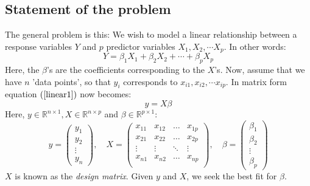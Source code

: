 \documentclass[12pt, a4paper]{article}
\begin{document}
\subsection{Statement of the problem}
The general problem is this: We wish to model a linear relationship between a response variables $Y$ and $p$ predictor variables $X_1, X_2,\cdots X_p$. In other words:
\begin{equation}
\label{linear1}
Y=\beta_1 X_1 + \beta_2 X_2 + \cdots + \beta_p X_p
\end{equation}
Here, the $\beta$'s are the coefficients corresponding to the $X$'s. Now, assume that we have $n$ 'data points', so that $y_i$ corresponds to $x_{i1}, x_{i2},\cdots x_{ip}$. In matrix form equation $(\ref{linear1})$ now becomes: 
\begin{equation}
\label{linear2}
y=X\beta
\end{equation}
Here, $y\in\mathbb{R}^{n\times 1}, X\in\mathbb{R}^{n\times p}$ and $\beta\in\mathbb{R}^{p\times 1}$:
\begin{equation}
y = 
\begin{pmatrix}
	y_1 \\ y_2 \\ \vdots \\ y_n
\end{pmatrix},\quad
X =
\begin{pmatrix}
	x_{11} 	& x_{12} 	& \ldots	& x_{1p} \\
	x_{21} 	& x_{22} 	& \ldots	& x_{2p} \\
	\vdots	& \vdots	& \ddots	& \vdots \\
	x_{n1} 	& x_{n2} 	& \ldots	& x_{np} \\
\end{pmatrix},\quad
\beta =
\begin{pmatrix}
	\beta_1	\\ \beta_2	\\ \vdots\\	\beta_p 
\end{pmatrix}
\end{equation}
$X$ is known as the \textit{design matrix}. Given $y$ and $X$, we seek the best fit for $\beta$.
\end{document}
